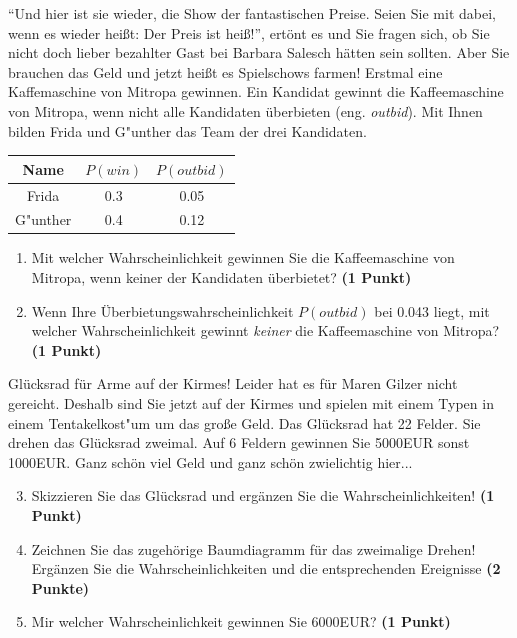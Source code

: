 \documentclass[a4paper, 9pt]{scrartcl}\usepackage[]{graphicx}\usepackage[]{xcolor}
\begin{document}
"`Und hier ist sie wieder, die Show der fantastischen Preise. Seien Sie mit
dabei, wenn es wieder hei{\ss}t: Der Preis ist hei{\ss}!"', ert{\"o}nt es und Sie
fragen sich, ob Sie nicht doch lieber bezahlter Gast bei Barbara Salesch
h{\"a}tten sein sollten. Aber Sie brauchen das Geld und jetzt hei{\ss}t es
Spielschows farmen! Erstmal eine Kaffemaschine von Mitropa
gewinnen. Ein Kandidat gewinnt die Kaffeemaschine von Mitropa, wenn nicht alle
Kandidaten {\"u}berbieten (eng. \textit{outbid}). Mit Ihnen bilden
Frida und G{"u}nther das Team der drei Kandidaten.

\begin{center}
\begin{tabular}{ccc}
  \toprule
  Name & $P(win)$ & $P(outbid)$\\
  \midrule
  Frida & 0.3 & 0.05\\
  G{"u}nther & 0.4 & 0.12 \\
  \bottomrule
\end{tabular}
\end{center}

\begin{enumerate}
\item Mit welcher Wahrscheinlichkeit gewinnen Sie die Kaffeemaschine von
  Mitropa, wenn keiner der Kandidaten {\"u}berbietet? \textbf{(1 Punkt)}
\item Wenn Ihre {\"U}berbietungswahrscheinlichkeit $P(outbid)$ bei
  0.043 liegt, mit welcher Wahrscheinlichkeit gewinnt
  \textit{keiner} die Kaffeemaschine von Mitropa? \textbf{(1 Punkt)}
\end{enumerate}

Gl{\"u}cksrad f{\"u}r Arme auf der Kirmes! Leider hat es f{\"u}r Maren Gilzer nicht
gereicht. Deshalb sind Sie jetzt auf der Kirmes und spielen mit
einem Typen in einem Tentakelkost{"u}m um das gro{\ss}e Geld. Das Gl{\"u}cksrad hat 22
Felder. Sie drehen das Gl{\"u}cksrad zweimal. Auf 6 Feldern
gewinnen Sie 5000EUR sonst 1000EUR. Ganz sch{\"o}n viel Geld
und ganz sch{\"o}n zwielichtig hier...

\begin{enumerate}
  \setcounter{enumi}{2}  
\item Skizzieren Sie das Gl{\"u}cksrad und erg{\"a}nzen Sie die
  Wahrscheinlichkeiten! \textbf{(1 Punkt)}
\item Zeichnen Sie das zugeh{\"o}rige Baumdiagramm f{\"u}r das zweimalige Drehen!
  Erg{\"a}nzen Sie die Wahrscheinlichkeiten und die entsprechenden Ereignisse
  \textbf{(2 Punkte)}
\item Mir welcher Wahrscheinlichkeit gewinnen Sie 6000EUR? \textbf{(1
    Punkt)}
\end{enumerate}
\end{document}
